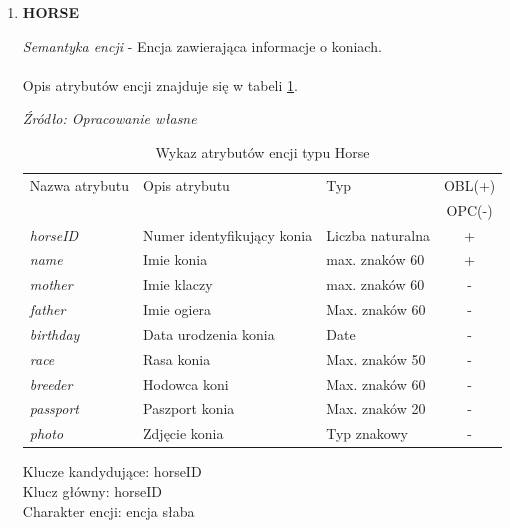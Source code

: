 \documentclass[12pt,twoside]{report}
\begin{document}
\begin{enumerate}[start=1,label={\bfseries ENC\textbackslash0\arabic*}]
	\item \textbf{HORSE}
	
	\textit{Semantyka encji} - Encja zawierająca informacje o koniach.
	\\ \\
	Opis atrybutów encji znajduje się w tabeli \ref{HorseAtribute}.
	
	\begin{table}[H]
		\caption{Wykaz atrybutów encji typu Horse }
		\textit{Źródło: Opracowanie własne}
		\label{HorseAtribute}
		\centering
		\begin{tabular}{|l|l|l|c|}
			\hline
			Nazwa atrybutu & Opis atrybutu & Typ & OBL(+) \\
			& & &  OPC(-) \\
			\hline
			\textit{horseID} & Numer identyfikujący konia & Liczba naturalna & + \\
			\hline
			\textit{name} &  Imie konia & max. znaków 60 & + \\
			\hline
			\textit{mother} &  Imie klaczy & max. znaków 60 & - \\
			\hline
			\textit{father} &  Imie ogiera & Max. znaków 60 & - \\
			\hline
			\textit{birthday} & Data urodzenia konia & Date & - \\
			\hline
			\textit{race} &  Rasa konia & Max. znaków 50 & - \\
			\hline
			\textit{breeder} &  Hodowca koni & Max. znaków 60 & - \\
			\hline
			\textit{passport} & Paszport konia & Max. znaków 20 & - \\
			\hline
			\textit{photo} & Zdjęcie konia & Typ znakowy & - \\
			\hline
		\end{tabular}
	\end{table}
	Klucze kandydujące: horseID \\
	Klucz główny: horseID \\
	Charakter encji: encja słaba \\
\end{enumerate}
\end{document}
